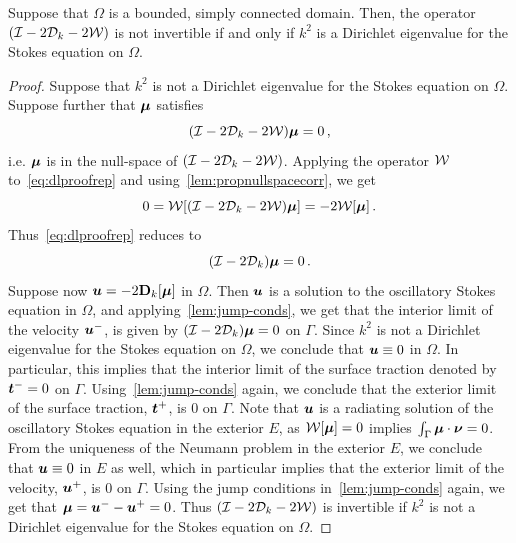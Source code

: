 \begin{thrm}
\label{thm:dlmain}
Suppose that $\Omega$ is a bounded, simply connected domain. Then, the operator
$(\mathcal I - 2{\mathcal D}_{k} - 2 {\mathcal W})$ is not invertible if and only if $k^2$ is a
Dirichlet eigenvalue for the Stokes equation on $\Omega$.
\end{thrm}
\begin{proof}
  Suppose that $k^2$ is not a Dirichlet eigenvalue for
  the Stokes equation on
$\Omega$. 
Suppose further that ${\boldsymbol \mu}$ satisfies
\begin{equation}
(\mathcal I - 2{\mathcal D}_{k} - 2{\mathcal W}) {\boldsymbol \mu} = 0 \, , \label{eq:dlproofrep}
\end{equation}
i.e. ${\boldsymbol \mu}$ is in the null-space
of $(\mathcal I - 2 {\mathcal D}_{k} - 2 {\mathcal W})$. 
Applying the operator ${\mathcal W}$ to~\cref{eq:dlproofrep} and 
using~\cref{lem:propnullspacecorr}, we get
\begin{equation}
0 = {\mathcal W} [(\mathcal I - 2{\mathcal D}_{k} - 2{\mathcal W}){\boldsymbol \mu}] = -2{\mathcal W} [{\boldsymbol \mu}] \, .
\end{equation}
Thus~\cref{eq:dlproofrep} reduces to
\begin{equation}
(\mathcal I - 2 {\mathcal D}_{k}){\boldsymbol \mu} = 0\, .
\end{equation}
Suppose now ${\boldsymbol u} = -2{\bf D}_{k}[{\boldsymbol \mu}]$ in $\Omega$.
Then ${\boldsymbol u}$ is a solution to the oscillatory Stokes equation in $\Omega$,
and applying~\cref{lem:jump-conds}, we get that the interior
limit of the velocity ${\boldsymbol u}^{-}$, is given by $(\mathcal I - 2{\mathcal D}_{k}) {\boldsymbol \mu} = 0$
on $\Gamma$. Since $k^2$ is not a Dirichlet eigenvalue for the Stokes
equation on $\Omega$, we conclude that ${\boldsymbol u} \equiv 0$ in $\Omega$. 
In particular, this implies that the interior limit of the surface traction
denoted by ${\boldsymbol t}^{-} = 0$ on $\Gamma$. 
Using~\cref{lem:jump-conds} again, we conclude that the exterior limit
of the surface traction, ${\boldsymbol t}^{+}$, is $0$ on $\Gamma$. 
Note that ${\boldsymbol u}$ is a radiating solution of the oscillatory
Stokes equation in the exterior $E$, as ${\mathcal W}[{\boldsymbol \mu}] = 0$ implies
$\int_{\Gamma} {\boldsymbol \mu} \cdot {\boldsymbol \nu} = 0$.
From the uniqueness of the Neumann problem in the
exterior $E$, we conclude that ${\boldsymbol u} \equiv 0$ in $E$ as well,
which in particular implies that
the exterior limit of the velocity, ${\boldsymbol u}^{+}$, is $0$ on $\Gamma$.   
Using the jump conditions in~\cref{lem:jump-conds} again, we
get that ${\boldsymbol \mu} = {\boldsymbol u}^{-} - {\boldsymbol u}^{+} = 0$.
Thus $(\mathcal I - 2{\mathcal D}_{k} - 2{\mathcal W})$ is invertible if $k^2$
is not a Dirichlet eigenvalue for the Stokes equation on $\Omega$.


\end{proof}
